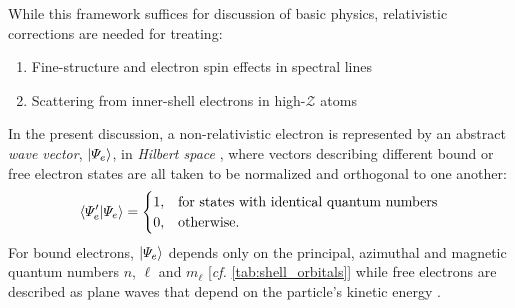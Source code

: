 While this framework suffices for discussion of basic physics, relativistic corrections are needed for treating:
\begin{enumerate}[noitemsep]
  \item Fine-structure and electron spin effects in spectral lines 
  \item Scattering from inner-shell electrons in high-$\mathcal{Z}$ atoms 
 \end{enumerate}
In the present discussion, a non-relativistic electron is represented by an abstract \emph{wave vector}, $\ket{\Psi_e}$, in \emph{Hilbert space} \cite{Hilbert1928}, where vectors describing different bound or free electron states are all taken to be normalized and orthogonal to one another:
\begin{equation}\label{eq:electron_orthonormal}
  \braket{\Psi_e'}{\Psi_e} =
  \begin{cases}
    1, & \text{for states with identical quantum numbers} \\ 
    0, & \text{otherwise.}
  \end{cases}
 \end{equation}
For bound electrons, $\ket{\Psi_e}$ depends only on the principal, azimuthal and magnetic quantum numbers $n$, $\ell$ and $m_{\ell}$ [\emph{cf.\@} \cref{tab:shell_orbitals}] while free electrons are described as plane waves that depend on the particle's kinetic energy \cite{Shankar04,Griffiths05,Townsend00}. 

